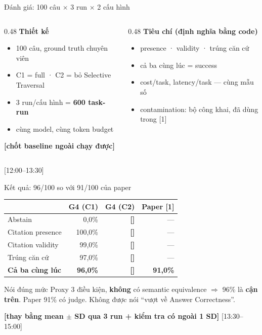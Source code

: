 \documentclass[aspectratio=169,10pt]{beamer}
\newcommand{\TODO}[1]{\textcolor{accent}{\textbf{[#1]}}}
\newcommand{\good}[1]{\textcolor{ok}{\textbf{#1}}}
\newcommand{\warn}[1]{\textcolor{bad}{\textbf{#1}}}
\newcommand{\tm}[1]{\hfill{\scriptsize\color{gray}[#1]}}
\begin{document}
\begin{frame}{Đánh giá: 100 câu $\times$ 3 run $\times$ 2 cấu hình}
  \begin{columns}[T]
    \begin{column}{0.48\textwidth}
      \textbf{Thiết kế}
      \begin{itemize}
        \item 100 câu, ground truth chuyên viên
        \item C1 = full · C2 = bỏ Selective Traversal
        \item 3 run/cấu hình = \textbf{600 task-run}
        \item cùng model, cùng token budget
      \end{itemize}
      \TODO{chốt baseline ngoài chạy được}
    \end{column}
    \begin{column}{0.48\textwidth}
      \textbf{Tiêu chí (định nghĩa bằng code)}
      \begin{itemize}
        \item presence · validity · trúng căn cứ
        \item cả ba cùng lúc = success
        \item cost/task, latency/task — cùng mẫu số
        \item contamination: bộ công khai, đã dùng trong [1]
      \end{itemize}
    \end{column}
  \end{columns}
  \tm{12:00–13:30}
\end{frame}

\begin{frame}{Kết quả: 96/100 so với 91/100 của paper}
  \begin{tabular}{@{}lrrr@{}}
    \toprule
    & G4 (C1) & G4 (C2) & Paper [1] \\
    \midrule
    Abstain & 0,0\% & \TODO{} & — \\
    Citation presence & 100,0\% & \TODO{} & — \\
    Citation validity & 99,0\% & \TODO{} & — \\
    Trúng căn cứ & 97,0\% & \TODO{} & — \\
    \midrule
    \textbf{Cả ba cùng lúc} & \good{\textbf{96,0\%}} & \TODO{} & \textbf{91,0\%} \\
    \bottomrule
  \end{tabular}
  \vspace{0.6em}
  \begin{block}{Nói đúng mức}
    Proxy 3 điều kiện, \textbf{không} có semantic equivalence $\Rightarrow$ 96\% là
    \warn{cận trên}. Paper 91\% có judge. Không được nói “vượt về Answer Correctness”.
  \end{block}
  \TODO{thay bằng mean $\pm$ SD qua 3 run + kiểm tra có ngoài 1 SD}
  \tm{13:30–15:00}
\end{frame}
\end{document}

